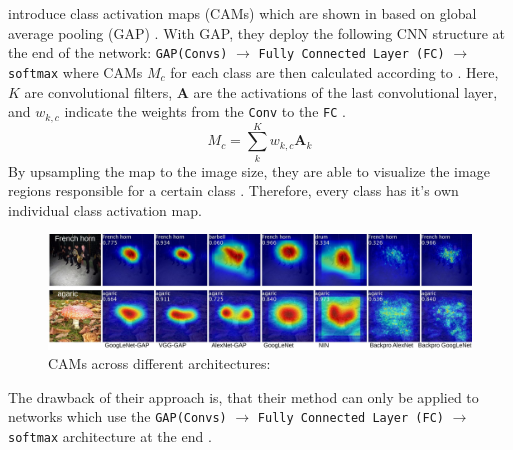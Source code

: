 \citet{ZhouKLOT16} introduce class activation maps (CAMs) which are shown in  based on global average pooling (GAP) \citep{LinCY13}. With GAP, they deploy the following CNN structure at the end of the network: \texttt{GAP(Convs)} $\rightarrow$ \texttt{Fully Connected Layer (FC)} $\rightarrow$ \texttt{softmax} \citep{LinCY13} where CAMs $M_{c}$ for each class are then calculated according to . Here, $K$ are convolutional filters, $\mathbf{A}$ are the activations of the last convolutional layer, and $ w_{k, c}$ indicate the weights from the \texttt{Conv} to the \texttt{FC} \citep{ZhouKLOT16}.
\begin{equation}
\label{eq:cam}
    M_{c}=\sum_{k}^{K} w_{k, c} \mathbf{A}_{k}
\end{equation}
By upsampling the map to the image size, they are able to visualize the image regions responsible for a certain class \citep{ZhouKLOT16}. Therefore, every class has it's own individual class activation map. 
\begin{figure}[htbp]
    \centering
    \includegraphics[width=\textwidth]{Figures/Chapter3/heatmapAll.pdf}
    \caption[CAMs across different architectures]{CAMs across different architectures: \citep{ZhouKLOT16}}
    \label{fig:cams}
\end{figure}
The drawback of their approach is, that their method can only be applied to networks which use the \texttt{GAP(Convs)} $\rightarrow$ \texttt{Fully Connected Layer (FC)} $\rightarrow$ \texttt{softmax} architecture at the end \citep{xie2020explainable}. 

